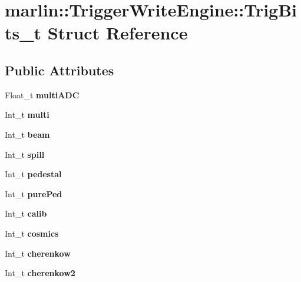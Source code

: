 \section{marlin::TriggerWriteEngine::TrigBits\_\-t Struct Reference}
\label{structmarlin_1_1TriggerWriteEngine_1_1TrigBits__t}
\subsection*{Public Attributes}
\begin{DoxyCompactItemize}
\item 
Float\_\-t {\bfseries multiADC}\label{structmarlin_1_1TriggerWriteEngine_1_1TrigBits__t_a4347c637d9d5cc941041471aeb0a368e}

\item 
Int\_\-t {\bfseries multi}\label{structmarlin_1_1TriggerWriteEngine_1_1TrigBits__t_aa84cb0deeb8c10c636fed313dc58fc7c}

\item 
Int\_\-t {\bfseries beam}\label{structmarlin_1_1TriggerWriteEngine_1_1TrigBits__t_a5ded3e3e0ca7bfb761a88dd9b36aeb0a}

\item 
Int\_\-t {\bfseries spill}\label{structmarlin_1_1TriggerWriteEngine_1_1TrigBits__t_a62e76a5fe3479d877b475cb5cc1fe906}

\item 
Int\_\-t {\bfseries pedestal}\label{structmarlin_1_1TriggerWriteEngine_1_1TrigBits__t_ad14c6b3edf9c4b75db859cab8cb8ecd7}

\item 
Int\_\-t {\bfseries purePed}\label{structmarlin_1_1TriggerWriteEngine_1_1TrigBits__t_a8de61b16a5a2d6f32111538e30166613}

\item 
Int\_\-t {\bfseries calib}\label{structmarlin_1_1TriggerWriteEngine_1_1TrigBits__t_a788b761850c9fc571f7218ecbba6f981}

\item 
Int\_\-t {\bfseries cosmics}\label{structmarlin_1_1TriggerWriteEngine_1_1TrigBits__t_a712c3da6ae3684991337390b43702523}

\item 
Int\_\-t {\bfseries cherenkow}\label{structmarlin_1_1TriggerWriteEngine_1_1TrigBits__t_af23ef9b3f15c347bdc09f11c00b86a85}

\item 
Int\_\-t {\bfseries cherenkow2}\label{structmarlin_1_1TriggerWriteEngine_1_1TrigBits__t_a9df71622c51d7fe4795e174877877201}


\end{DoxyCompactItemize}
